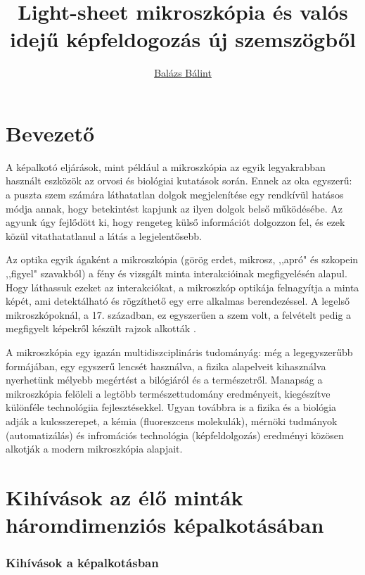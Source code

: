 \documentclass{booklet_style}
\author{\href{mailto:balint.balazs@embl.de}{Balázs Bálint}}
\title{Light-sheet mikroszkópia és valós idejű képfeldogozás új szemszögből}
\begin{document}
\graphicspath{{./figures/}}
\maketitle

\clearpage{\thispagestyle{empty}\cleardoublepage}


\setcounter{page}{1}
\section{Bevezető}

A képalkotó eljárások, mint például a mikroszkópia az egyik legyakrabban használt eszközök az orvosi és biológiai kutatások során. Ennek az oka egyszerű: a puszta szem számára láthatatlan dolgok megjelenítése egy rendkívül hatásos módja annak, hogy betekintést kapjunk az ilyen dolgok belső működésébe. Az agyunk úgy fejlődött ki, hogy rengeteg külső információt dolgozzon fel, és ezek közül vitathatatlanul a látás a legjelentősebb.

Az optika egyik ágaként a mikroszkópia (görög erdet, mikrosz, ,,apró" és szkopein ,,figyel" szavakból) a fény és vizsgált minta interakcióinak megfigyelésén alapul. Hogy láthassuk ezeket az interakciókat, a mikroszkóp optikája felnagyítja a minta képét, ami detektálható és rögzíthető egy erre alkalmas berendezéssel. A legelső mikroszkópoknál, a 17. században, ez egyszerűen a szem volt, a felvételt pedig a megfigyelt képekről készült rajzok alkották \cite{hooke_micrographia:_1665}.

A mikroszkópia egy igazán multidiszciplináris tudományág: még a legegyszerűbb formájában, egy egyszerű lencsét használva, a fizika alapelveit kihasználva nyerhetünk mélyebb megértést a bilógiáról és a természetről. Manapság a mikroszkópia felöleli a legtöbb természettudomány eredményeit, kiegészítve különféle technológiia fejlesztésekkel. Ugyan továbbra is a fizika és a biológia adják a kulcsszerepet, a kémia (fluoreszcens molekulák), mérnöki tudmányok (automatizálás) és infromációs technológia (képfeldolgozás) eredményi közösen alkotják a modern mikroszkópia alapjait.

\section{Kihívások az élő minták háromdimenziós képalkotásában}


\subsubsection{Kihívások a képalkotásban}
\end{document}
